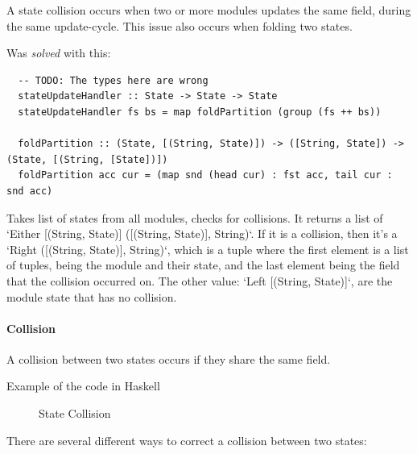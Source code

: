 A state collision occurs when two or more modules updates the same field, during
the same update-cycle. This issue also occurs when folding two states.

Was \textit{solved} with this:

\begin{verbatim}
  -- TODO: The types here are wrong
  stateUpdateHandler :: State -> State -> State
  stateUpdateHandler fs bs = map foldPartition (group (fs ++ bs))

  foldPartition :: (State, [(String, State)]) -> ([String, State]) -> (State, [(String, [State])])
  foldPartition acc cur = (map snd (head cur) : fst acc, tail cur : snd acc)
\end{verbatim}

Takes list of states from all modules, checks for collisions. It returns a
list of `Either [(String, State)] ([(String, State)], String)`. If it is a
collision, then it's a `Right ([(String, State)], String)`, which is a tuple
where the first element is a list of tuples, being the module and their
state, and the last element being the field that the collision occurred on.
The other value: `Left [(String, State)]`, are the module state that has no
collision.

\paragraph{Collision} A collision between two states occurs if they share the same
field.

Example of the code in Haskell

\begin{figure}
  \centering
  
  \caption{State Collision}
\end{figure}

There are several different ways to correct a collision between two
states:

